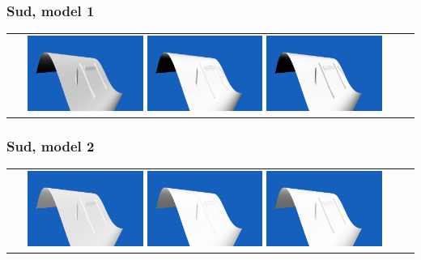 \documentclass[a4paper]{article}
\begin{document}
\subsubsection{Sud, model 1}
\begin{tabular}{cc}
\includegraphics[width=0.3\textwidth]{Images/Essais/Essai_8_phong_South_0.png}
\includegraphics[width=0.3\textwidth]{Images/Essais/Essai_8_slint_South_0.png}
\includegraphics[width=0.3\textwidth]{Images/Essais/Essai_9_slint_South_0.png}


\end{tabular}
\subsubsection{Sud, model 2}
\begin{tabular}{cc}
\includegraphics[width=0.3\textwidth]{Images/Essais/Essai_8_phong_South_1.png}
\includegraphics[width=0.3\textwidth]{Images/Essais/Essai_8_slint_South_1.png}
\includegraphics[width=0.3\textwidth]{Images/Essais/Essai_9_slint_South_1.png}

\end{tabular}
\end{document}
